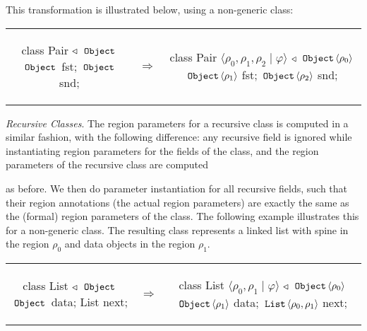 This transformation is illustrated below, using a non-generic  class:

\begin{tabular}{ccc}
\begin{minipage}{0.35\linewidth}
\begin{codejava}
class Pair $\triangleleft$ $\,{\tt Object}\,$ {
  $\,{\tt Object}\,$ fst;
  $\,{\tt Object}\,$ snd;
}
\end{codejava}
\end{minipage}
&
$\Rightarrow$
&
\begin{minipage}{0.6\linewidth}
\begin{codejava}
class Pair $\langle \rho_0, \rho_1, \rho_2 \; | \; \varphi \rangle$ $\triangleleft$ $\,{\tt Object}\, \langle \rho_0 \rangle$ {
  $\,{\tt Object}\, \langle \rho_1 \rangle$ fst;
  $\,{\tt Object}\, \langle \rho_2 \rangle$ snd;
}
\end{codejava}
\end{minipage}
\end{tabular}

\emph{Recursive Classes}.
The region parameters for a recursive class is computed in
a similar fashion, with the following difference: any recursive
field is ignored while instantiating region parameters for the fields of
the class, and the region parameters of the recursive class are computed

as before. We then do parameter instantiation for all recursive fields,
such that their region annotations (the actual region parameters) are
exactly the same as the (formal) region parameters of the class.
The following example illustrates this for a non-generic  class.
The resulting class represents a linked list with spine in the region
$\rho_0$ and data objects in the region $\rho_1$.

\begin{tabular}{ccc}
\begin{minipage}{0.35\linewidth}
\begin{codejava}
class List $\triangleleft$ $\,{\tt Object}\,$ {
  $\,{\tt Object}\,$ data;
  List next;
}
\end{codejava}
\end{minipage}
&
$\Rightarrow$
&
\begin{minipage}{0.65\linewidth}
\begin{codejava}
class List $\langle \rho_0, \rho_1 \; | \; \varphi \rangle$ $\triangleleft$ $\,{\tt Object}\, \langle \rho_0 \rangle$ {
  $\,{\tt Object}\, \langle \rho_1 \rangle$ data;
  $\,{\tt List}\, \langle \rho_0, \rho_1 \rangle$ next;
}
\end{codejava}
\end{minipage}
\end{tabular}

